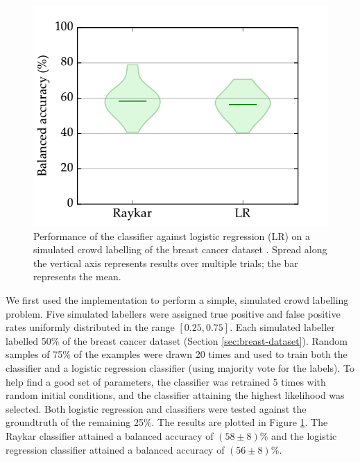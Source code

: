             \begin{figure}
                \centering
                \includegraphics[height=0.3\textheight]
                    {images/experiments/raykar.pdf}
                \caption{Performance of the \citeauthor{raykar10} classifier
                    against logistic regression (LR) on a simulated crowd
                    labelling of the breast cancer dataset \citep{wolberg90}.
                    Spread along the vertical axis represents results over
                    multiple trials; the bar represents the mean.}
                \label{fig:raykar}
            \end{figure}

            We first used the implementation to perform a simple, simulated
            crowd labelling problem. Five simulated labellers were assigned true
            positive and false positive rates uniformly distributed in the range
            $[0.25, 0.75]$. Each simulated labeller labelled 50\% of the breast
            cancer dataset (Section \ref{sec:breast-dataset}). Random samples of
            75\% of the examples were drawn 20 times and used to train both the
            \citeauthor{raykar10} classifier and a logistic regression
            classifier (using majority vote for the labels). To help find a good
            set of parameters, the \citeauthor{raykar10} classifier was
            retrained 5 times with random initial conditions, and the classifier
            attaining the highest likelihood was selected. Both logistic
            regression and \citeauthor{raykar10} classifiers were tested against
            the groundtruth of the remaining 25\%. The results are plotted in
            Figure \ref{fig:raykar}. The Raykar classifier attained a balanced
            accuracy of $(58 \pm 8)\%$ and the logistic regression classifier
            attained a balanced accuracy of $(56
            \pm 8)\%$.

